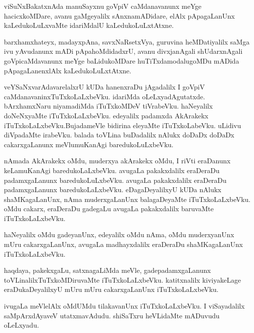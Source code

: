 \documentclass{article}
\begin{document}
\begin{mn}%
viSuNxBakatxnAda manuSayxnu goVpiV caMdanavanunx meYge hacicxkoMDare, avanu gaMgeyalilx 
sAnxnamADidare, elAlx pApagaLanUnx kaLedukoLuLxvaMte idariMdalU kaLedukoLuLxtAtxne.
\end{mn}

\begin{mn}%
barxhamxhateyx, madayxpAna, savxNaRsetxVya, guruvina heMDatiyalilx saMga ivu yAvudanunx mADi 
pApahoMdidadxrU, avanu divxjanAgali shUdarxnAgali goVpicaMdavanunx meYge baLidukoMDare 
huTiTxdamodalugoMDu mADida pApagaLanenxlAlx kaLedukoLuLxtAtxne.
\end{mn}

\begin{mn}%
veYSaNxvarAdavarelalxrU kUDa hanenxraDu jAgadalilx I goVpiV caMdanavaninxTuTxkoLaLxbeVku. idariMda 
oLeLxyadAgutatxde. bArxhamxNaru niyamadiMda iTuTxkoMDeV tiVrabeVku. haNeyalilx doNeNxyaMte 
iTuTxkoLaLxbeVku. edeyalilx padamxda AkArakekx iTuTxkoLaLxbeVku.BujadameVle bidirina eleyaMte 
iTuTxkoLabeVku. uLidivu diVpadaMte irabeVku. balada toVLina buDadalilx nAlukx doDaDx doDaDx 
cakarxgaLanunx meVlumuKanAgi baredukoLuLxbeVku.
\end{mn}

\begin{mn}%
nAmada AkArakekx oMdu, muderxya akArakekx oMdu, I riVti eraDanunx keLamuKanAgi baredukoLaLxbeVku. 
avugaLa pakakxdalilx eraDeraDu padamxgaLanunx baredukoLuLxbeVku. avugaLa pakakxdalilx eraDeraDu 
padamxgaLanunx baredukoLaLxbeVku. eDagaDeyalilxyU kUDa nAlukx shaMKagaLanUnx, nAma muderxgaLanUnx 
balagaDeyaMte iTuTxkoLaLxbeVku. oMdu cakarx, eraDeraDu gadegaLu avugaLa pakakxdalilx baruvaMte 
iTuTxkoLaLxbeVku.
\end{mn}

\begin{mn}%
haNeyalilx oMdu gadeyanUnx, edeyalilx oMdu nAma, oMdu muderxyanUnx mUru cakarxgaLanUnx, avugaLa 
madhayxdalilx eraDeraDu shaMKagaLanUnx iTuTxkoLaLxbeVku.
\end{mn}

\begin{mn}%
haqdaya, pakekxgaLu, satxnagaLiMda meVle, gadepadamxgaLanunx toVLinalilxTuTxkoMDiruvaMte 
iTuTxkoLaLxbeVku. katitxnalilx kiviyakeLage eraDukaDeyalilxyU mUru mUru cakarxgaLanUnx 
iTuTxkoLaLxbeVku.
\end{mn}

\begin{mn}%
ivugaLa meVlelAlx oMdUMdu tilakavanUnx iTuTxkoLaLxbeVku. I viSayadalilx saMpArxdAyaveV 
utatxmavAdudu. shiSaTxru heVLidaMte mADuvudu oLeLxyadu.
\end{mn}
\end{document}
